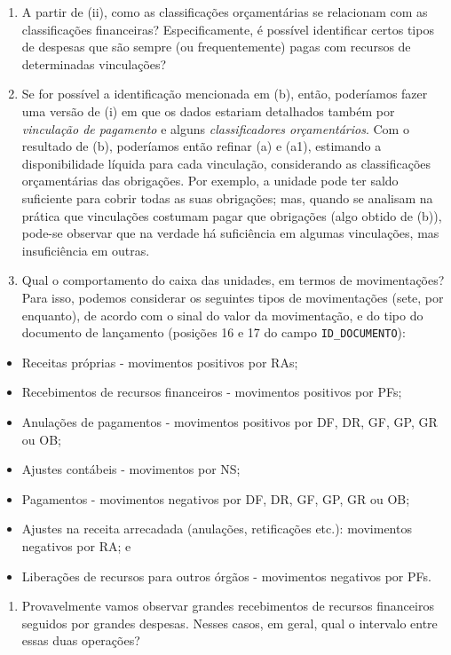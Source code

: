 \documentclass[]{book}
\providecommand{\tightlist}{%
  \setlength{\itemsep}{0pt}\setlength{\parskip}{0pt}}
\begin{document}
\begin{enumerate}
\def\labelenumi{\alph{enumi}.}
\setcounter{enumi}{1}
\item
  A partir de (ii), como as classificações orçamentárias se relacionam com as classificações financeiras? Especificamente, é possível identificar certos tipos de despesas que são sempre (ou frequentemente) pagas com recursos de determinadas vinculações?
\item
  Se for possível a identificação mencionada em (b), então, poderíamos fazer uma versão de (i) em que os dados estariam detalhados também por \emph{vinculação de pagamento} e alguns \emph{classificadores orçamentários}. Com o resultado de (b), poderíamos então refinar (a) e (a1), estimando a disponibilidade líquida para cada vinculação, considerando as classificações orçamentárias das obrigações. Por exemplo, a unidade pode ter saldo suficiente para cobrir todas as suas obrigações; mas, quando se analisam na prática que vinculações costumam pagar que obrigações (algo obtido de (b)), pode-se observar que na verdade há suficiência em algumas vinculações, mas insuficiência em outras.
\item
  Qual o comportamento do caixa das unidades, em termos de movimentações? Para isso, podemos considerar os seguintes tipos de movimentações (sete, por enquanto), de acordo com o sinal do valor da movimentação, e do tipo do documento de lançamento (posições 16 e 17 do campo \texttt{ID\_DOCUMENTO}):
\end{enumerate}

\begin{itemize}
\tightlist
\item
  Receitas próprias - movimentos positivos por RAs;
\item
  Recebimentos de recursos financeiros - movimentos positivos por PFs;
\item
  Anulações de pagamentos - movimentos positivos por DF, DR, GF, GP, GR ou OB;
\item
  Ajustes contábeis - movimentos por NS;
\item
  Pagamentos - movimentos negativos por DF, DR, GF, GP, GR ou OB;
\item
  Ajustes na receita arrecadada (anulações, retificações etc.): movimentos negativos por RA; e
\item
  Liberações de recursos para outros órgãos - movimentos negativos por PFs.
\end{itemize}

\begin{enumerate}
\def\labelenumi{\alph{enumi}.}
\setcounter{enumi}{4}
\tightlist
\item
  Provavelmente vamos observar grandes recebimentos de recursos financeiros seguidos por grandes despesas. Nesses casos, em geral, qual o intervalo entre essas duas operações?
\end{enumerate}
\end{document}
